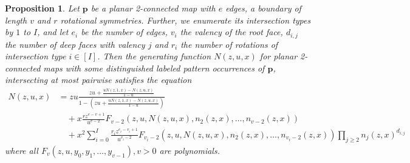 \documentclass[10pt,a4paper]{amsart}
\newtheorem{proposition}{Proposition}
\newcommand{\map}[1]{\textbf{#1}}
\begin{document}
\begin{proposition} \label{thm:nonsep_dec}
    Let $\map{p}$ be a planar 2-connected map with $e$ edges, a boundary of length $v$ and $r$ rotational symmetries. Further, we enumerate its intersection types by $1$ to $I$, and let $e_i$ be the number of edges, $v_i$ the valency of the root face, $d_{i,j}$ the number of deep faces with valency $j$ and $r_i$ the number of rotations of intersection type $i \in [I]$. Then the generating function $N(z,u,x)$ for planar 2-connected maps with some distinguished labeled pattern occurrences of $\map{p}$, intersecting at most pairwise satisfies the equation
    \begin{align*}
        N(z,u,x) &= zu\frac{zu+\frac{uN(z,1,x)-N(z,u,x)}{1-u}}{1-\left(zu+\frac{uN(z,1,x)-N(z,u,x)}{1-u}\right)} \\
        &\quad + x\frac{rz^{e-v+1}}{u^{v-2}}F_{v-2}(z,u,N(z,u,x),n_2(z,x),\dots,n_{v-2}(z,x))\\
        &\quad + x^2\sum_{i=0}^I \frac{r_iz^{e_i-v_i+1}}{u^{v_i-2}}F_{v_i-2}(z,u,N(z,u,x),n_2(z,x),\dots,n_{v_i-2}(z,x))\prod_{j\geq 2} n_j(z,x)^{d_{i,j}}
    \end{align*}
    where all $F_v(z,u,y_0,y_1,\dots, y_{v-1}), v>0$ are polynomials.
\end{proposition}
\end{document}
